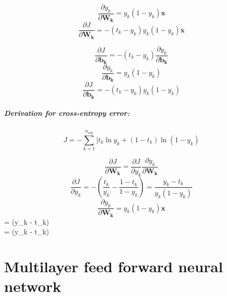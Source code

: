 \documentclass{article}
\begin{document}
$$\dfrac{\partial{y_k}}{\partial{\mathbf{W_k}}} = y_k(1 - y_k)\mathbf{x}$$
$$\dfrac{\partial{J}}{\partial{\mathbf{W_k}}} = -(t_k - y_k)y_k(1 - y_k)\mathbf{x}$$


$$\dfrac{\partial{J}}{\partial{\mathbf{b_k}}} = -(t_k - y_k) \dfrac{\partial{y_k}}{\partial{\mathbf{b_k}}}$$
$$\dfrac{\partial{y_k}}{\partial{\mathbf{b_k}}} = y_k(1 - y_k)$$
$$\dfrac{\partial{J}}{\partial{\mathbf{b_k}}} = -(t_k - y_k)y_k(1 - y_k)$$

\subparagraph{Derivation for cross-entropy error:}
$$J = -\sum_{k=1}^{n_{out}}[t_k \ln{y_k} + (1-t_k)\ln{(1-y_k)}$$

$$\dfrac{\partial{J}}{\partial{\mathbf{W_k}}} = \dfrac{\partial{J}}{\partial{y_k}} \dfrac{\partial{y_k}}{\partial{\mathbf{W_k}}}$$
$$\dfrac{\partial{J}}{\partial{y_k}} = -(\frac{t_k}{y_k} - \frac{1 - t_k}{1 - y_k}) = \frac{y_k - t_k}{y_k (1 - y_k)}$$
$$\dfrac{\partial{y_k}}{\partial{\mathbf{W_k}}} = y_k (1 - y_k) \mathbf{x}

$$ = (y_k - t_k) $$
$$ = (y_k - t_k)$$

\section*{Multilayer feed forward neural network}
\end{document}
